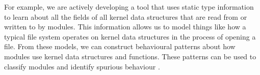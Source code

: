 \documentclass[preprint]{sigplanconf}
\begin{document}




For example, we are actively developing a tool that uses static type information to learn about all the fields of all kernel data structures that are read from or written to by modules. This information allows us to model things like how a typical file system operates on kernel data structures in the process of opening a file. From these models, we can construct behavioural patterns about how modules use kernel data structures and functions. These patterns can be used to classify modules \cite{DeviceDriverClassification} and identify spurious behaviour \cite{LXFI}.
\end{document}
